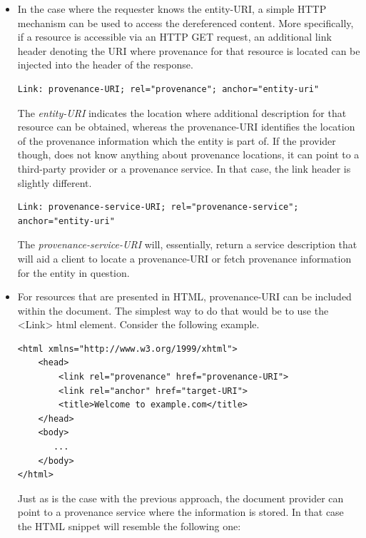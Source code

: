 \begin{itemize}
  \item
        In the case where the requester knows the entity-URI, a simple HTTP mechanism can be used to access the dereferenced content. More specifically, if a resource is accessible via an HTTP GET request, an additional link header denoting the URI where provenance for that resource is located can be injected into the header of the response.

\begin{verbatim}
Link: provenance-URI; rel="provenance"; anchor="entity-uri"
\end{verbatim}

        The \emph{entity-URI} indicates the location where additional description for that resource can be obtained, whereas the provenance-URI identifies the location of the provenance information which the entity is part of. If the provider though, does not know anything about provenance locations, it can point to a third-party provider or a provenance service. In that case, the link header is slightly different.

\begin{verbatim}
Link: provenance-service-URI; rel="provenance-service";
anchor="entity-uri"
\end{verbatim}

        The \emph{provenance-service-URI} will, essentially, return a service description that will aid a client to locate a provenance-URI or fetch provenance information for the entity in question.

  \item
        For resources that are presented in HTML, provenance-URI can be included within the document. The simplest way to do that would be to use the <Link> html element. Consider the following example.

\begin{verbatim}
<html xmlns="http://www.w3.org/1999/xhtml">
    <head>
        <link rel="provenance" href="provenance-URI">
        <link rel="anchor" href="target-URI">
        <title>Welcome to example.com</title>
    </head>
    <body>
       ...
    </body>
</html>
\end{verbatim}

        Just as is the case with the previous approach, the document provider can point to a provenance service where the information is stored. In that case the HTML snippet will resemble the following one:


\end{itemize}

